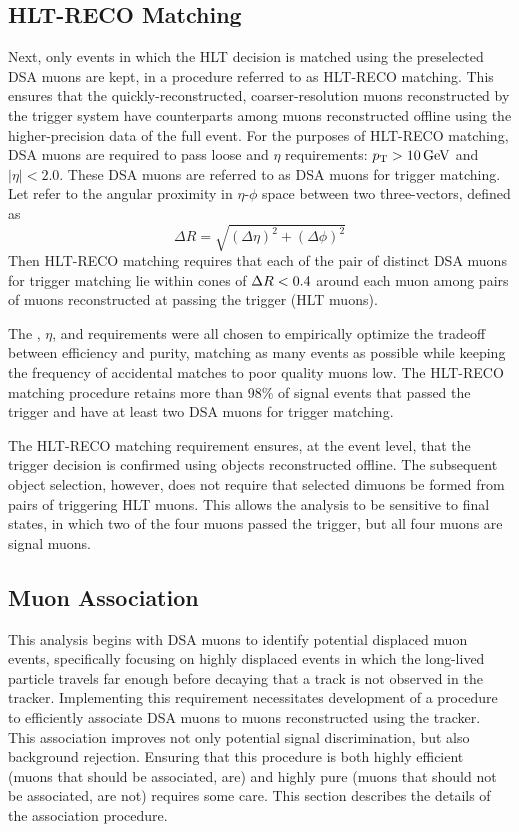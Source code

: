 \subsection{HLT-RECO Matching}
\label{sec:dd:HLTMatching}
Next, only events in which the HLT decision is matched using the preselected DSA muons are kept, in a procedure referred to as HLT-RECO matching.
This ensures that the quickly-reconstructed, coarser-resolution muons reconstructed by the trigger system have counterparts among muons reconstructed offline using the higher-precision data of the full event.
For the purposes of HLT-RECO matching, DSA muons are required to pass loose \pT and $\eta$ requirements: $p_{\mathrm{T}} > 10\,\text{Ge\hspace{-.08em}V}$ and $|\eta| < 2.0$.
These DSA muons are referred to as DSA muons for trigger matching.
Let \deltaR refer to the angular proximity in $\eta$-$\phi$ space between two three-vectors, defined as
\begin{equation}
  \Delta R = \sqrt{\left(\Delta\eta\right)^2 + \left(\Delta\phi\right)^2}
  \label{eq:dd:deltaR}
\end{equation}
Then HLT-RECO matching requires that each of the pair of distinct DSA muons for trigger matching lie within cones of $\Delta R < 0.4$ around each muon among pairs of muons reconstructed at \Ltwo passing the trigger (HLT muons).

The \pT, $\eta$, and \deltaR requirements were all chosen to empirically optimize the tradeoff between efficiency and purity, matching as many events as possible while keeping the frequency of accidental matches to poor quality muons low.
The HLT-RECO matching procedure retains more than 98\% of \twoMu signal events that passed the trigger and have at least two DSA muons for trigger matching.

The HLT-RECO matching requirement ensures, at the event level, that the trigger decision is confirmed using objects reconstructed offline.
The subsequent object selection, however, does not require that selected dimuons be formed from pairs of triggering HLT muons.
This allows the analysis to be sensitive to \fourMu final states, in which two of the four muons passed the trigger, but all four muons are signal muons.

\subsection{\DSAToPAT Muon Association}
\label{sec:dd:Association}
This analysis begins with DSA muons to identify potential displaced muon events, specifically focusing on highly displaced events in which the long-lived particle travels far enough before decaying that a track is not observed in the tracker.
Implementing this requirement necessitates development of a procedure to efficiently associate DSA muons to muons reconstructed using the tracker.
This association improves not only potential signal discrimination, but also background rejection.
Ensuring that this procedure is both highly efficient (\ie muons that should be associated, are) and highly pure (\ie muons that should not be associated, are not) requires some care.
This section describes the details of the association procedure.

